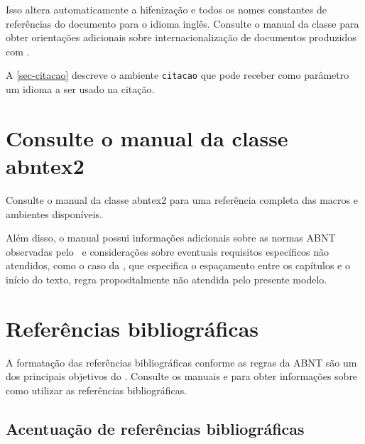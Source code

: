 \documentclass[12pt,oneside,a4paper,chapter=TITLE,english,brazil]{abntex2}
\begin{document}
\begin{anexosenv}
Isso altera automaticamente a hifenização e todos os nomes constantes de referências do documento para o idioma inglês. Consulte o manual da classe \cite{abntex2classe} para obter orientações adicionais sobre internacionalização de documentos produzidos com \abnTeX.

A \autoref{sec-citacao} descreve o ambiente \texttt{citacao} que pode receber como parâmetro um idioma a ser usado na citação.

\section{Consulte o manual da classe \textsf{abntex2}}

Consulte o manual da classe \textsf{abntex2} \cite{abntex2classe} para uma referência completa das macros e ambientes disponíveis. 

Além disso, o manual possui informações adicionais sobre as normas ABNT observadas pelo \abnTeX\ e considerações sobre eventuais requisitos específicos não atendidos, como o caso da , que especifica o espaçamento entre os capítulos e o início do texto, regra propositalmente não atendida pelo presente modelo.

\section{Referências bibliográficas}

A formatação das referências bibliográficas conforme as regras da ABNT são um dos principais objetivos do \abnTeX. Consulte os manuais  e  para obter informações sobre como utilizar as referências bibliográficas.

\subsection{Acentuação de referências bibliográficas}


\end{anexosenv}
\end{document}
